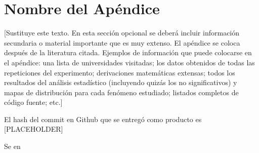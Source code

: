 \chapter{Nombre del Apéndice}\label{apendiceA}

[Sustituye este texto.
En esta sección opcional se deberá incluir información secundaria o material importante que es muy extenso. El apéndice se coloca después de la literatura citada. Ejemplos de información que puede colocarse en el apéndice: una lista de universidades visitadas; los datos obtenidos de todas las repeticiones del experimento; derivaciones matemáticas extensas; todos los resultados del análisis estadístico (incluyendo quizás los no significativos) y mapas de distribución para cada fenómeno estudiado; listados completos de código fuente; etc.]

El hash del commit en Github que se entregó como producto es [PLACEHOLDER]

Se en
